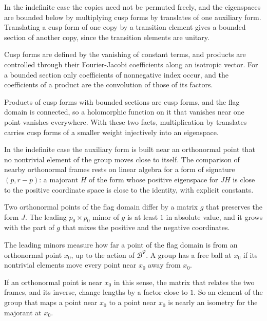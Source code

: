 In the indefinite case the copies need not be permuted freely, and the eigenspaces are bounded below
by multiplying cusp forms by translates of one auxiliary form. Translating a cusp form of one copy by a
transition element gives a bounded section of another copy, since the transition elements are
unitary.

Cusp forms are defined by the vanishing of constant terms, and products are controlled through their
Fourier-Jacobi coefficients along an isotropic vector. For a bounded section only coefficients of
nonnegative index occur, and the coefficients of a product are the convolution of those of its
factors.

Products of cusp forms with bounded sections are cusp forms, and the flag domain is connected, so a
holomorphic function on it that vanishes near one point vanishes everywhere. With these two facts,
multiplication by translates carries cusp forms of a smaller weight injectively into an eigenspace.

In the indefinite case the auxiliary form is built near an orthonormal point that no nontrivial element of
the group moves close to itself. The comparison of nearby orthonormal frames rests on linear algebra for a
form of signature $(p,r-p)$: a majorant $H$ of the form whose positive eigenspace for $JH$ is close to the
positive coordinate space is close to the identity, with explicit constants.

Two orthonormal points of the flag domain differ by a matrix $g$ that preserves the form $J$. The leading
$p_0\times p_0$ minor of $g$ is at least $1$ in absolute value, and it grows with the part of $g$ that mixes
the positive and the negative coordinates.

The leading minors measure how far a point of the flag domain is from an orthonormal point $x_0$, up to
the action of $\mathcal B^\Psi$. A group has a free ball at $x_0$ if its nontrivial elements move every point
near $x_0$ away from $x_0$.

If an orthonormal point is near $x_0$ in this sense, the matrix that relates the two frames, and its
inverse, change lengths by a factor close to $1$. So an element of the group that maps a point near $x_0$
to a point near $x_0$ is nearly an isometry for the majorant at $x_0$.

